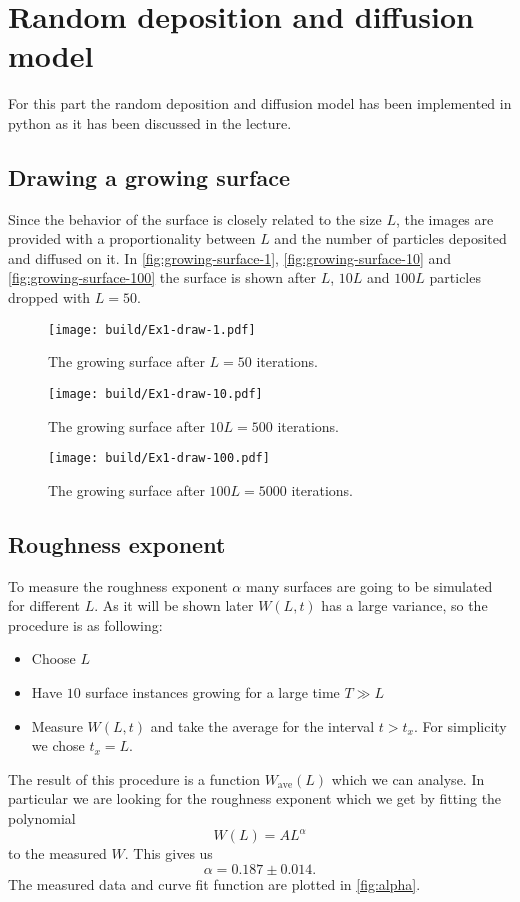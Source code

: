 \section{Random deposition and diffusion model}
\label{sec:exercise-1}
For this part the random deposition and diffusion model has been implemented in python as it has been discussed in the
lecture. 

\subsection{Drawing a growing surface}
\label{sec:RDD-drawing}
Since the behavior of the surface is closely related to the size $L$, the images are provided with a proportionality
between $L$ and the number of particles deposited and diffused on it. In 
\autoref{fig:growing-surface-1},
\autoref{fig:growing-surface-10} and
\autoref{fig:growing-surface-100}
the surface is shown after $L$, $10L$ and $100L$ particles dropped with $L=50$.
\begin{figure}
	\centering
  \texttt{[image: build/Ex1-draw-1.pdf]}
  \caption{The growing surface after $L = 50$ iterations.}
  \label{fig:growing-surface-1}
\end{figure}
\begin{figure}
	\centering
  \texttt{[image: build/Ex1-draw-10.pdf]}
  \caption{The growing surface after $10L = 500$ iterations.}
  \label{fig:growing-surface-10}
\end{figure}
\begin{figure}
	\centering
  \texttt{[image: build/Ex1-draw-100.pdf]}
  \caption{The growing surface after $100L = 5000$ iterations.}
  \label{fig:growing-surface-100}
\end{figure}

\subsection{Roughness exponent}
To measure the roughness exponent $\alpha$ many surfaces are going to be simulated for different $L$. As it will be
shown later $W(L,t)$ has a large variance, so the procedure is as following:
\begin{itemize}
  \item Choose $L$
  \item Have $10$ surface instances growing for a large time $T \gg L$
  \item Measure $W(L,t)$ and take the average for the interval $t > t_x$. For simplicity we chose $t_x = L$.
\end{itemize}
The result of this procedure is a function $W_\text{ave}(L)$ which we can analyse. In particular we are looking for the
roughness exponent which we get by fitting the polynomial 
\[
  W(L) = A L^\alpha
\]
to the measured $W$. This gives us
\[
  \alpha = 0.187 \pm 0.014.
\]
The measured data and curve fit function are plotted in \autoref{fig:alpha}.



